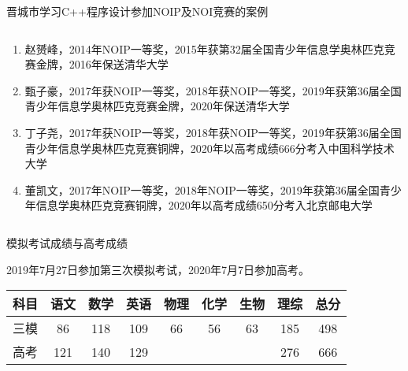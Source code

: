 \documentclass{beamer}
\begin{document}
\begin{frame}[t]{晋城市学习C++程序设计参加NOIP及NOI竞赛的案例}
\begin{columns}
\begin{spacing}{1.4}
\normalsize
    \begin{enumerate}[label={\arabic*.}]
    \item 赵赟峰，2014年NOIP一等奖，2015年获第32届全国青少年信息学奥林匹克竞赛金牌，2016年保送清华大学
	\item 甄子豪，2017年获NOIP一等奖，2018年获NOIP一等奖，2019年获第36届全国青少年信息学奥林匹克竞赛金牌，2020年保送清华大学
	\item 丁子尧，2017年获NOIP一等奖，2018年获NOIP一等奖，2019年获第36届全国青少年信息学奥林匹克竞赛铜牌，2020年以高考成绩666分考入中国科学技术大学
	\item 董凯文，2017年NOIP一等奖，2018年NOIP一等奖，2019年获第36届全国青少年信息学奥林匹克竞赛铜牌，2020年以高考成绩650分考入北京邮电大学
\end{enumerate}
\end{spacing} 
\end{columns}
\end{frame}

\begin{frame}[t]{模拟考试成绩与高考成绩}
\vspace*{1cm}
\centering
\begin{spacing}{1.5}
\large
2019年7月27日参加第三次模拟考试，2020年7月7日参加高考。\\
\vspace{2cm}
\begin{tabular}{|c|c|c|c|c|c|c|c|c|}
\hline
科目 & 语文 & 数学 & 英语 & 物理 & 化学 & 生物 & 理综 & 总分 \\
\hline
三模 & 86 & 118 & 109 & 66 & 56 & 63 & 185 & 498 \\
\hline
高考 & 121 & 140 & 129 &  &  &  & 276 &  666\\
\hline
\end{tabular}
\end{spacing}
\end{frame}
\end{document}
